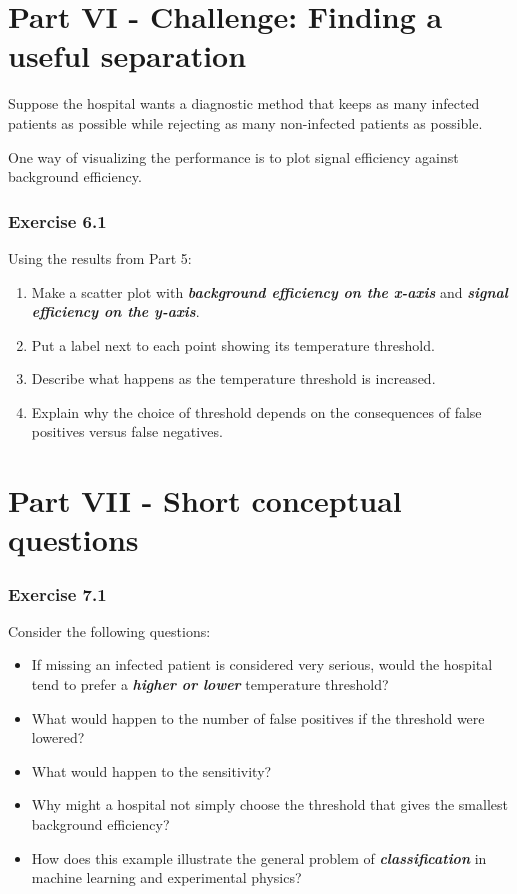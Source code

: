 \documentclass{course_sheet}
\begin{document}
\section*{Part VI - Challenge: Finding a useful separation}
Suppose the hospital wants a diagnostic method that keeps as many infected patients as possible while rejecting as many non-infected patients as possible.

One way of visualizing the performance is to plot signal efficiency against background efficiency.

\subsubsection*{Exercise 6.1}
Using the results from Part 5:

\begin{enumerate}
\item
Make a scatter plot with \textbf{\textit{background efficiency on the x-axis}} and \textbf{\textit{signal efficiency on the y-axis}}.

\item
Put a label next to each point showing its temperature threshold.

\item
Describe what happens as the temperature threshold is increased.

\item
Explain why the choice of threshold depends on the consequences of false positives versus false negatives.

\end{enumerate}
\clearpage
\section*{Part VII - Short conceptual questions}
\subsubsection*{Exercise 7.1}
Consider the following questions:

\begin{itemize}
\item
If missing an infected patient is considered very serious, would the hospital tend to prefer a \textbf{\textit{higher or lower}} temperature threshold?

\item
What would happen to the number of false positives if the threshold were lowered?

\item
What would happen to the sensitivity?

\item
Why might a hospital not simply choose the threshold that gives the smallest background efficiency?

\item
How does this example illustrate the general problem of \textbf{\textit{classification}} in machine learning and experimental physics?

\end{itemize}
\end{document}
